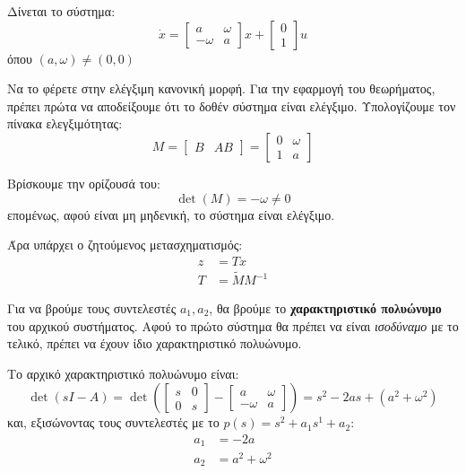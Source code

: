 \documentclass[11pt,a4paper,notitlepage,fleqn]{article}
\let\mytodo\todo
\renewcommand{\todo}[1]{\par\mytodo[inline,noline]{#1}}
\begin{document}
\begin{exercise}[Παράδειγμα]
	Δίνεται το σύστημα: \[
	\dot x = \left[\begin{matrix}
	a & \omega \\ -\omega &  a
	\end{matrix}\right]x + \left[\begin{matrix}
	0 \\ 1
	\end{matrix}\right]u
	\] όπου \( (a,\omega ) \neq (0,0) \)

	Να το φέρετε στην ελέγξιμη κανονική μορφή.
	\tcblower
	Για την εφαρμογή του θεωρήματος, πρέπει πρώτα να αποδείξουμε ότι το
	δοθέν σύστημα είναι ελέγξιμο.
	Υπολογίζουμε τον πίνακα ελεγξιμότητας:
	\[
	M=\left[\begin{matrix}
	B & AB
	\end{matrix}\right] = \left[\begin{matrix}
	0 & \omega \\ 1 & a
	\end{matrix}\right]
	\]

	Βρίσκουμε την ορίζουσά του:
	\[
	\det(M) = -\omega  \neq 0
	\]
	επομένως, αφού είναι μη μηδενική, το σύστημα είναι ελέγξιμο.
	\todo{really?}

	Άρα υπάρχει ο ζητούμενος μετασχηματισμός:
	\begin{align*}
		z &= Tx \\
		T &= \tilde M M^{-1}
	\end{align*}

	Για να βρούμε τους συντελεστές \( a_1, a_2 \), θα βρούμε το
	\textbf{χαρακτηριστικό πολυώνυμο} του αρχικού συστήματος. Αφού το πρώτο
	σύστημα θα πρέπει να είναι \textit{ισοδύναμο} με το τελικό, πρέπει
	να έχουν ίδιο χαρακτηριστικό πολυώνυμο.

	Το αρχικό χαρακτηριστικό πολυώνυμο είναι:
	\[
	\det(sI-A) = \det\left(
	\left[\begin{matrix}
	s & 0 \\ 0 & s
	\end{matrix}\right]-\left[\begin{matrix}
	a & \omega  \\ -\omega &a
	\end{matrix}\right]
	\right) = s^2-2as + (a^2+\omega^2)
	\]
	και, εξισώνοντας τους συντελεστές με το \( p(s) = s^2 + a_1s^1 + a_2 \):
	\begin{align*}
		a_1 &= -2a \\
		a_2 &= a^2+\omega^2
	\end{align*}


\end{exercise}
\end{document}
